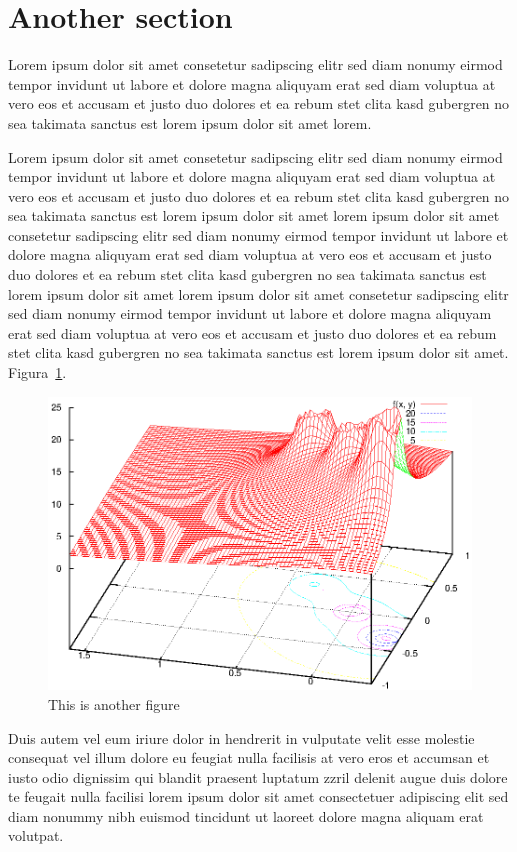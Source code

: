 \section{Another section}

Lorem ipsum dolor sit amet consetetur sadipscing elitr sed diam
nonumy eirmod tempor invidunt ut labore et dolore magna aliquyam
erat sed diam voluptua at vero eos et accusam et justo duo dolores
et ea rebum stet clita kasd gubergren no sea takimata sanctus est
lorem ipsum dolor sit amet lorem.~\cite{XIAOAPL05}

Lorem ipsum dolor sit amet consetetur sadipscing elitr sed diam
nonumy eirmod tempor invidunt ut labore et dolore magna aliquyam
erat sed diam voluptua at vero eos et accusam et justo duo dolores
et ea rebum stet clita kasd gubergren no sea takimata sanctus est
lorem ipsum dolor sit amet lorem ipsum dolor sit amet consetetur
sadipscing elitr sed diam nonumy eirmod tempor invidunt ut labore
et dolore magna aliquyam erat sed diam voluptua at vero eos et
accusam et justo duo dolores et ea rebum stet clita kasd gubergren
no sea takimata sanctus est lorem ipsum dolor sit amet lorem ipsum
dolor sit amet consetetur sadipscing elitr sed diam nonumy eirmod
tempor invidunt ut labore et dolore magna aliquyam erat sed diam
voluptua at vero eos et accusam et justo duo dolores et ea rebum
stet clita kasd gubergren no sea takimata sanctus est lorem ipsum
dolor sit amet. Figura~\ref{fig:fig2}.

\begin{figure}[htb]
\centering\includegraphics[width=.75\textwidth]{fig/exemplo1.eps}
\caption{\label{fig:fig2}This is another figure}
\end{figure}

Duis autem vel eum iriure dolor in hendrerit in vulputate velit
esse molestie consequat vel illum dolore eu feugiat nulla
facilisis at vero eros et accumsan et iusto odio dignissim qui
blandit praesent luptatum zzril delenit augue duis dolore te
feugait nulla facilisi lorem ipsum dolor sit amet consectetuer
adipiscing elit sed diam nonummy nibh euismod tincidunt ut laoreet
dolore magna aliquam erat volutpat.


